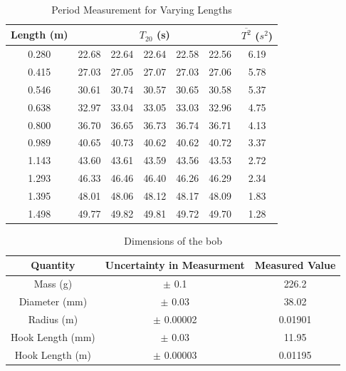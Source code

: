 \documentclass[iop]{emulateapj}
\begin{document}
\begin{table}[H]
\caption{Period Measurement for Varying Lengths} %
\centering %
\begin{tabular}{c rrrrr c} %
\hline\hline %
Length (m) & \multicolumn{5}{c}{$T_{20}$ (s)} & $\overline{T^2}$ ($s^2$)\\ [0.5ex]
\hline %
0.280 & 22.68 & 22.64 & 22.64 & 22.58 & 22.56 & 6.19\\ %
0.415 & 27.03 & 27.05 & 27.07 & 27.03 & 27.06 & 5.78\\
0.546 & 30.61 & 30.74 & 30.57 & 30.65 & 30.58 & 5.37\\
0.638 & 32.97 & 33.04 & 33.05 & 33.03 & 32.96 & 4.75\\
0.800 & 36.70 & 36.65 & 36.73 & 36.74 & 36.71 & 4.13\\
0.989 & 40.65 & 40.73 & 40.62 & 40.62 & 40.72 & 3.37\\
1.143 & 43.60 & 43.61 & 43.59 & 43.56 & 43.53 & 2.72\\
1.293 & 46.33 & 46.46 & 46.40 & 46.26 & 46.29 & 2.34\\
1.395 & 48.01 & 48.06 & 48.12 & 48.17 & 48.09 & 1.83\\
1.498 & 49.77 & 49.82 & 49.81 & 49.72 & 49.70 & 1.28\\ [1ex] %
\hline %
\end{tabular}
\label{tab:hresult}
\end{table}


\begin{table}[H]
\caption{Dimensions of the bob} %
\centering %
\begin{tabular}{c c c} %
\hline\hline %
Quantity & Uncertainty in Measurment & Measured Value\\ [0.5ex]
\hline %
Mass (g) & $\pm$ 0.1 & 226.2\\ %
Diameter (mm) & $\pm$ 0.03 & 38.02\\
Radius (m) & $\pm$ 0.00002 & 0.01901\\
Hook Length (mm)& $\pm$ 0.03 & 11.95\\
Hook Length (m)& $\pm$ 0.00003 & 0.01195\\[1ex] %
\hline %
\end{tabular}
\label{tab:hresult}
\end{table}
\end{document}

